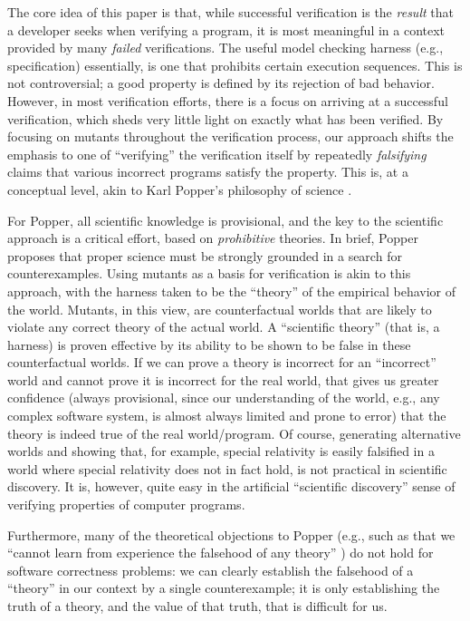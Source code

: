 \documentclass{svjour3}
\begin{document}
The core idea of this paper is that, while successful verification is
the \emph{result} that a developer seeks when verifying a program, it
is most meaningful in a context provided by many \emph{failed} verifications.
The useful model checking harness (e.g., specification) essentially,
is one that prohibits certain execution sequences.  This is not
controversial; a good property is defined by its rejection of bad
behavior.  However, in most verification efforts, there is a focus on
arriving at a successful verification, which sheds very little light
on exactly what has been verified.  By focusing on mutants throughout the
verification process, our approach shifts the emphasis to one of
``verifying'' the verification itself by repeatedly \emph{falsifying}
claims that various incorrect programs satisfy the property.  This is,
at a conceptual level, akin to Karl Popper's philosophy of science
\cite{Popper}.

For Popper, all scientific knowledge is provisional, and the key to
the scientific approach is a critical effort, based on
\emph{prohibitive} theories.  In brief, Popper proposes that proper
science must be strongly grounded in a search for counterexamples.
Using mutants as a basis for verification is akin to this approach,
with the harness taken to be the ``theory'' of the empirical behavior
of the world.  Mutants, in this view, are counterfactual worlds that
are likely to violate any correct theory of the actual world.  A
``scientific theory'' (that is, a harness) is proven effective by its
ability to be shown to be false in these counterfactual worlds.
If we can prove a theory is incorrect for an ``incorrect'' world and
cannot prove it is incorrect for the real world, that gives us greater
confidence (always provisional, since our understanding of the world,
e.g., any complex software system, is almost always limited and prone
to error) that the theory is indeed true of the real world/program.
Of course, generating alternative worlds and showing that, for
example, special relativity is easily falsified in a world where
special relativity does not in fact hold, is not practical in
scientific discovery.  It is, however, quite easy in the artificial
``scientific discovery'' sense of verifying properties of computer
programs.

Furthermore, many of the theoretical objections to Popper (e.g., such
as that we ``cannot learn from experience the falsehood of any
theory'' \cite{lakatos}) do not hold for software correctness
problems:  we can clearly establish the falsehood of a ``theory'' in
our context by a single counterexample; it is only establishing the
truth of a theory, and the value of that truth, that is difficult for us.
\end{document}
